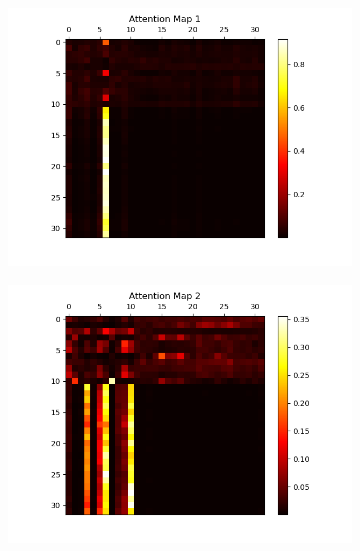 \documentclass[10pt]{article}
\theoremstyle{definition}
\begin{document}
\begin{figure}[H]
    \centering
    \begin{subfigure}[b]{0.45\textwidth}
        \centering
        \includegraphics[width=\textwidth]{../data/plots/part1/attention_map_1.png}
        \label{subfig:am1}
    \end{subfigure}
    \hfill
    \begin{subfigure}[b]{0.45\textwidth}
        \centering
        \includegraphics[width=\textwidth]{../data/plots/part1/attention_map_2.png}
        \label{subfig:am2}
    \end{subfigure}
    \vfill
    \begin{subfigure}[b]{0.45\textwidth}
        \centering

\end{subfigure}
\end{figure}
\end{document}
